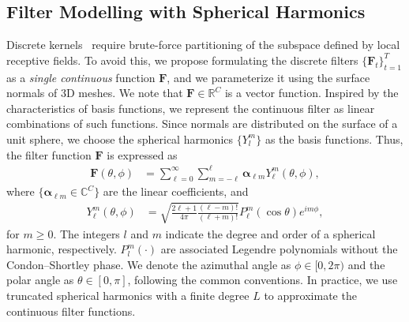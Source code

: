 {\subsection{Filter Modelling with Spherical Harmonics}\label{subsec:continuous_filter_ylm}
Discrete kernels~\cite{lei2021picasso, thomas2019kpconv, choy20194d, lei2020spherical} require brute-force partitioning of the subspace defined by local receptive fields. To avoid this, we propose formulating the discrete filters $\{\mathbf{F}_t\}_{t=1}^T$ as a \textit{single continuous} function $\mathbf{F}$, and we parameterize it using the surface normals of 3D meshes. We note that $\mathbf{F}{\in}\mathbb{R}^C$ is a vector function. Inspired by the characteristics of basis functions, we represent the continuous filter as linear combinations of such functions. Since normals are distributed on the surface of a unit sphere, we choose the spherical harmonics $\{Y_l^m\}$ as the basis functions. Thus, the filter function $\mathbf{F}$ is expressed as 
\begin{align}\label{eq:spharm_filter}
\mathbf{F}(\theta,\phi) &= \sum_{\ell=0}^{\infty}\sum_{m=-\ell}^{\ell}\boldsymbol{\alpha}_{\ell m}Y_{\ell}^m(\theta,\phi),
\end{align}
where $\{\boldsymbol{\alpha}_{\ell m}\in\mathbb{C}^C\}$ are the linear coefficients, and 
\begin{align}\label{eq:ylm}
Y_{\ell}^m(\theta,\phi) &= \sqrt{\frac{2\ell+1}{4\pi}\frac{(\ell-m)!}{(\ell+m)!}}P_{\ell}^m(\cos{\theta})e^{im\phi},
\end{align}
for $m\geq0$. The integers $l$ and $m$ indicate the degree and order of a spherical harmonic, respectively. $P_l^m(\cdot)$ are associated Legendre polynomials without the Condon–Shortley phase.    
We denote the azimuthal angle as $\phi \in [0,2\pi)$ and the polar angle as $\theta \in [0,\pi]$, following the common conventions. In practice, we use truncated spherical harmonics with a finite degree $L$ to approximate the continuous filter functions.

}
